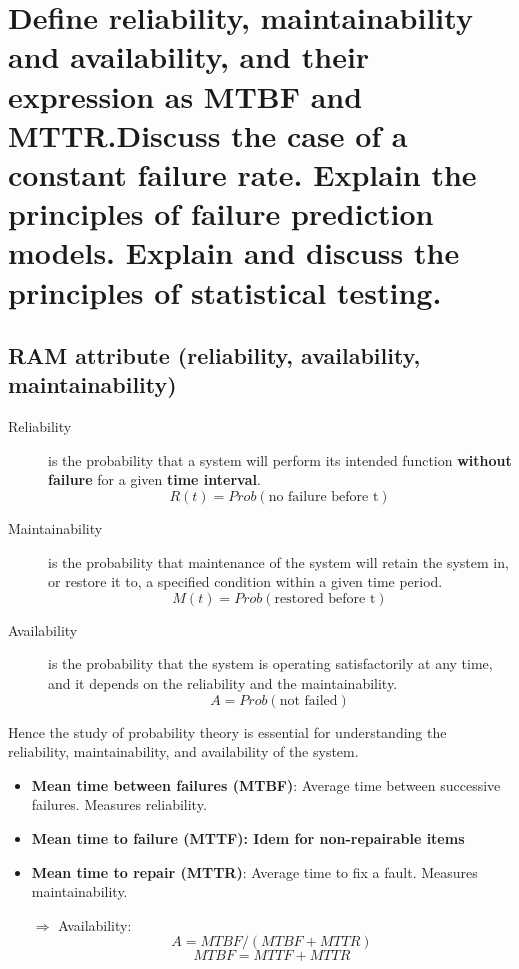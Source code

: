 \clearpage{}
\section{Define reliability, maintainability and availability, and their
expression as MTBF and MTTR.\@ Discuss the case of a constant failure rate.
Explain the principles of failure prediction models. Explain and discuss
the principles of statistical testing.}

\subsection{RAM attribute (reliability, availability, maintainability)}

\begin{description}

    \item[Reliability] is the probability that a system will perform its
        intended function \textbf{without failure} for a given \textbf{time interval}. 
    $$R(t) = Prob(\text{no failure before t})$$

    \item[Maintainability] is the probability that maintenance of the
        system will retain the system in, or restore it to, a specified
        condition within a given time period. 
        $$M(t) = Prob(\text{restored before t})$$

    \item[Availability] is the probability that the system is operating
        satisfactorily at any time, and it depends on the reliability
        and the maintainability.  
        $$A = Prob(\text{not failed})$$
\end{description}

Hence the study of probability theory is essential for understanding the
reliability, maintainability, and availability of the system.

\begin{itemize}

    \item \textbf{Mean time between failures (MTBF)}: Average time
        between successive failures. Measures reliability.

    \item \textbf{Mean time to failure (MTTF): Idem for non-repairable
        items}

    \item \textbf{Mean time to repair (MTTR)}: Average time to fix a fault.
        Measures maintainability. 

    \item[$\Rightarrow$] Availability: $$A = MTBF / (MTBF + MTTR)$$
        $$MTBF = MTTF + MTTR$$
\end{itemize}

